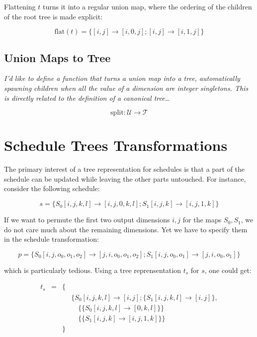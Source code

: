 \documentclass{article}
\begin{document}
Flattening $t$ turns it into a regular union map, where the ordering of the children of the root tree is made explicit:

\[
    \mathrm{flat}(t) = \{ [i,j] \rightarrow [i,0,j] ; [i,j] \rightarrow [i,1,j] \}
\]

\subsection{Union Maps to Tree}

{ \raggedleft\emph{I'd like to define a function that turns a union map into a
tree, automatically spawning children when all the value of a dimension are
integer singletons. This is directly related to the definition of a canonical tree\dots} }

\[
    \mathrm{split}: \mathcal{U} \rightarrow \mathcal{T}
\]



\section{Schedule Trees Transformations}

The primary interest of a tree representation for schedules is that a part of
the schedule can be updated while leaving the other parts untouched. For instance, consider the following schedule:

\[
    s = \{ S_0[i,j,k,l] \rightarrow [i,j,0,k,l] ; S_1[i,j,k] \rightarrow [i,j,1,k] \}
\]

If we want to permute the first two output dimensions $i, j$ for the maps
$S_0, S_1$, we do not care much about the remaining dimensions. Yet we have to
specify them in the schedule transformation:

\[
    p = \{ S_0[i,j,o_0,o_1,o_2] \rightarrow [j,i,o_0,o_1,o_2] ; S_1[i,j,o_0, o_1] \rightarrow [j,i,o_0,o_1] \}
\]

\noindent which is particularly tedious. Using a tree reprensentation $t_s$ for $s$, one could get:

\[
    \begin{array}{lcll}
        t_s &=& \{ &\\
            & &    & \{S_0[i,j,k,l] \rightarrow [i,j] ; \{S_1[i,j,k,l] \rightarrow [i,j] \},\\
            & &    & \quad\{ \{ S_0[i,j,k,l] \rightarrow [0,k,l] \} \}\\
            & &    & \quad\{ \{ S_1[i,j,k] \rightarrow [i,j,1,k] \} \}\\
            & & \} &\\
    \end{array}
\]
\end{document}
